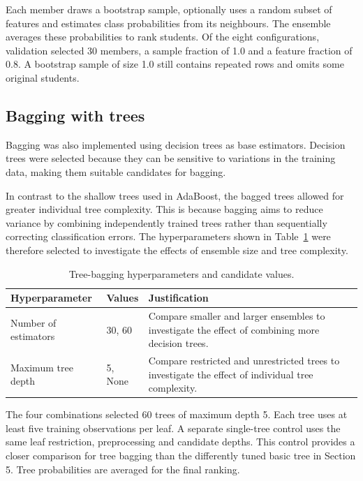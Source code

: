 Each member draws a bootstrap sample, optionally uses a random subset of
features and estimates class probabilities from its neighbours. The ensemble
averages these probabilities to rank students. Of the eight configurations,
validation selected 30 members, a sample fraction of 1.0 and a feature fraction
of 0.8. A bootstrap sample of size 1.0 still contains repeated rows and omits
some original students.

\subsection{Bagging with trees}

Bagging was also implemented using decision trees as base estimators. Decision trees were selected because they can be sensitive to variations in the training data, making them suitable candidates for bagging.

In contrast to the shallow trees used in AdaBoost, the bagged trees allowed for greater individual tree complexity. This is because bagging aims to reduce variance by combining independently trained trees rather than sequentially correcting classification errors. The hyperparameters shown in Table~\ref{tab:bagged-tree-hyperparameters} were therefore selected to investigate the effects of ensemble size and tree complexity.


\begin{table}[H]
    \centering
    \caption[Tree-bagging tuning grid]{Tree-bagging hyperparameters and candidate values.}
    \label{tab:bagged-tree-hyperparameters}
    \begin{tabularx}{\linewidth}{@{}l l X@{}}
        \hline
        \textbf{Hyperparameter} & \textbf{Values} & \textbf{Justification} \\
        \hline
        Number of estimators & 30, 60 &
        Compare smaller and larger ensembles to investigate the effect of combining more decision trees. \\

        Maximum tree depth & 5, None &
        Compare restricted and unrestricted trees to investigate the effect of individual tree complexity. \\
        \hline
    \end{tabularx}
\end{table}


The four combinations selected 60 trees of maximum depth 5. Each tree uses at
least five training observations per leaf. A separate single-tree control uses
the same leaf restriction, preprocessing and candidate depths. This control
provides a closer comparison for tree bagging than the differently tuned basic
tree in Section 5. Tree probabilities are averaged for the final ranking.

